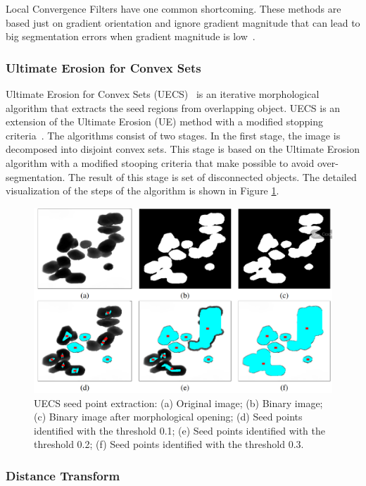 \documentclass{lutmscthesis}[2010/09/22]
\begin{document}
Local Convergence Filters have one common shortcoming. These methods are based just on gradient orientation and ignore gradient magnitude that can lead to big segmentation errors when gradient magnitude
is low~\cite{LCF}. 



\subsubsection{Ultimate Erosion for Convex Sets}

Ultimate Erosion for Convex Sets (UECS)~\cite{UECS} is an iterative morphological algorithm that extracts
the seed regions from overlapping object. UECS is an extension of the Ultimate Erosion
(UE) method with a modified stopping criteria~\cite{UECS}. The algorithms consist of two stages. In the first stage, the image is decomposed into disjoint convex sets. This stage is based on the Ultimate Erosion algorithm with a modified stooping criteria that make possible to avoid over-segmentation. The result of this stage is set of disconnected objects.
The detailed visualization of the steps of the algorithm is shown in Figure \ref{fig:UECS-alg}.

\begin{figure} [ht]
  \includegraphics[width=\linewidth]{UECS.png}
  \caption{UECS seed point extraction: (a) Original image; 
    (b) Binary image; 
    (c) Binary image after morphological opening; 
    (d) Seed points identified with the threshold 0.1;
    (e) Seed points identified with the threshold 0.2;
    (f) Seed points identified with the threshold 0.3.~\cite{zafari-thesis}}
  \label{fig:UECS-alg}
\end{figure}

\subsubsection{Distance Transform}
\end{document}
